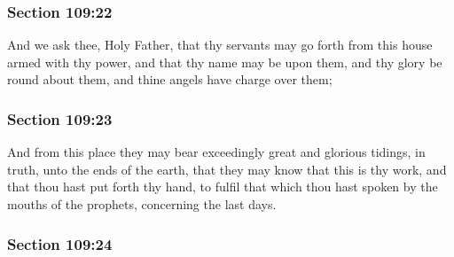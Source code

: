 
	\subsubsection{Section 109:22} %
		\label{DC109-22}

		And we ask thee, Holy Father, that thy servants may go forth from this house armed with thy power, and that thy name may be upon them, and thy glory be round about them, and thine angels have charge over them;


	\subsubsection{Section 109:23} %
		\label{DC109-23}

		And from this place they may bear exceedingly great and glorious tidings, in truth, unto the ends of the earth, that they may know that this is thy work, and that thou hast put forth thy hand, to fulfil that which thou hast spoken by the mouths of the prophets, concerning the last days.


	\subsubsection{Section 109:24} %
		\label{DC109-24}

